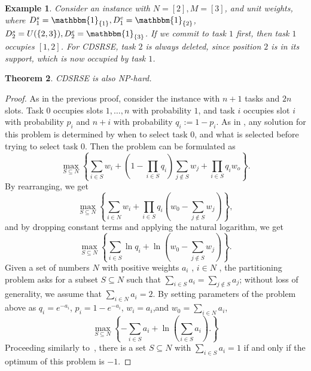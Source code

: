 \documentclass{article}
\newtheorem{theorem}{Theorem}[section]
\newtheorem{example}[theorem]{Example}
\begin{document}
\begin{example}
\label{eg:2}
    Consider an instance with $N=[2],M=[3]$, and unit weights, where $D_1^s=\mathbbm{1}_{\{1\}},D_1^e=\mathbbm{1}_{\{2\}}$, $D_2^s=U(\{2,3\}),D_2^e=\mathbbm{1}_{\{3\}}$.
If we commit to task $1$ first, then task $1$ occupies $[1,2]$.
For CDSRSE, task $2$ is always deleted, since position $2$ is in its support, which is now occupied by task $1$.
\end{example}
\begin{theorem}%
    CDSRSE is also NP-hard.
\end{theorem}
\begin{proof}
    As in the previous proof, consider the instance with $n+1$ tasks and $2n$ slots. 
    Task $0$ occupies slots $1,\ldots,n$ with probability $1$, and task $i$ occupies slot $i$ with probability $p_i$ and $n+i$ with probability $q_i:=1-p_i$.
    As in \cite{DNP}, any solution for this problem is determined by when to select task $0$, and what is selected before trying to select task $0$.
    Then the problem can be formulated as
    \begin{equation}
    \label{Conserv-JS}
    \tag{Conserv-JS}
    \max_{S\subseteq N}\left\{\sum_{i\in S}w_i+(1-\prod_{i\in S}q_i)\sum_{j\notin S}w_j+\prod_{i\in S}q_iw_o\right\}.
    \end{equation}
    By rearranging, we get 
    \[\max_{S\subseteq N}\left\{\sum_{i\in N}w_i+\prod_{i\in S}q_i(w_0-\sum_{j\notin S}w_j)\right\},\]
    and by dropping constant terms and applying the natural logarithm, we get 
    \[\max_{S\subseteq N}\left\{\sum_{i\in S}\ln q_i+\ln(w_0-\sum_{j\notin S}w_j)\right\}.\]
    Given a set of numbers $N$ with positive weights $a_i$ , $i \in N$ , the partitioning problem asks for a subset $S \subseteq N$ such that $\sum_{i\in S}a_i = \sum_{j\notin S} a_j$; without loss of generality, we assume that $\sum_{i\in N} a_i = 2$.
    By setting parameters of the problem above as $q_i = e^{-a_i}$, $p_i = 1-e^{-a_i}$, $w_i =a_i$,and $w_0 = \sum_{i\in N} a_i$,
    \[\max_{S\subseteq N}\left\{-\sum_{i\in S}a_i+\ln(\sum_{i \in S}a_i).\right\}\]
Proceeding similarly to~\cite{Star-Graph-NP-hard}, there is a set $S \subseteq N$ with $\sum_{i\in S}a_i=1$ if and only if the optimum of this problem is $-1$.
\end{proof}
\end{document}
